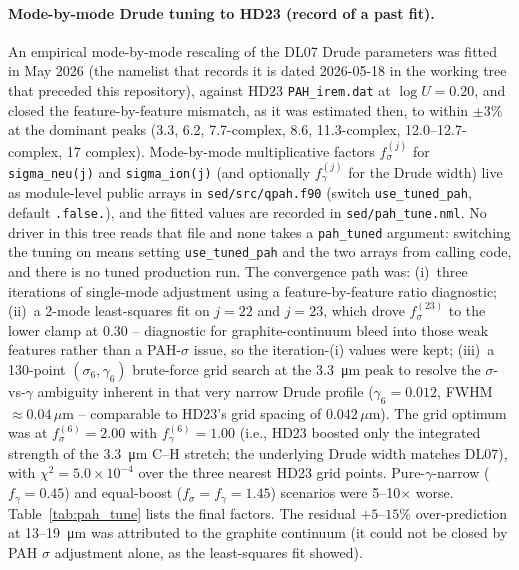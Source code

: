 \documentclass{my_memo}
\begin{document}
\paragraph{Mode-by-mode Drude tuning to HD23 (record of a past fit).}
An empirical mode-by-mode rescaling of the DL07 Drude parameters was
fitted in May 2026 (the namelist that records it is dated 2026-05-18 in
the working tree that preceded this repository), against HD23
\texttt{PAH\_irem.dat} at $\log U = 0.20$, and closed the
feature-by-feature mismatch, as it was estimated then, to within
$\pm 3\%$ at the dominant peaks (3.3, 6.2, 7.7-complex, 8.6,
11.3-complex, 12.0--12.7-complex, 17 complex). Mode-by-mode
multiplicative factors $f^{(j)}_\sigma$ for \texttt{sigma\_neu(j)} and
\texttt{sigma\_ion(j)} (and optionally $f^{(j)}_\gamma$ for the Drude
width) live as module-level public arrays in \texttt{sed/src/qpah.f90}
(switch \texttt{use\_tuned\_pah}, default \texttt{.false.}), and the
fitted values are recorded in \texttt{sed/pah\_tune.nml}. No driver in
this tree reads that file and none takes a \texttt{pah\_tuned}
argument: switching the tuning on means setting
\texttt{use\_tuned\_pah} and the two arrays from calling code, and there
is no tuned production run. The convergence path was: (i)~three
iterations of single-mode adjustment using a feature-by-feature ratio
diagnostic; (ii)~a 2-mode least-squares fit on $j=22$ and $j=23$, which
drove $f^{(23)}_\sigma$ to the lower clamp at $0.30$ -- diagnostic for
graphite-continuum bleed into those weak features rather than a
PAH-$\sigma$ issue, so the iteration-(i) values were kept; (iii)~a
130-point $(\sigma_6, \gamma_6)$ brute-force grid search at the
\SI{3.3}{\micro\meter} peak to resolve the $\sigma$-vs-$\gamma$
ambiguity inherent in that very narrow Drude profile
($\gamma_6 = 0.012$, FWHM $\approx 0.04\,\mu$m -- comparable to HD23's
grid spacing of $0.042\,\mu$m). The grid optimum was at
$f^{(6)}_\sigma = 2.00$ with $f^{(6)}_\gamma = 1.00$ (i.e., HD23 boosted
only the integrated strength of the \SI{3.3}{\micro\meter} C--H
stretch; the underlying Drude width matches DL07), with
$\chi^2 = 5.0\times 10^{-4}$ over the three nearest HD23 grid points.
Pure-$\gamma$-narrow ($f_\gamma = 0.45$) and equal-boost
($f_\sigma = f_\gamma = 1.45$) scenarios were 5--10$\times$ worse.
Table~\ref{tab:pah_tune} lists the final factors. The residual
$+5$--$15\%$ over-prediction at 13--\SI{19}{\micro\meter} was attributed
to the graphite continuum (it could not be closed by PAH $\sigma$
adjustment alone, as the least-squares fit showed).
\end{document}

